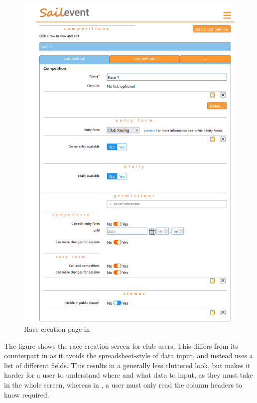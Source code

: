 \documentclass{l4proj}
\begin{document}
\begin{figure}[H]
    \centering
    \includegraphics[width=1\linewidth]{images/Sailevent.png} 

    \caption{Race creation page in \citet{SailEvent}
    }

    \label{fig:sailEvent}
\end{figure}


The figure shows the race creation screen for club users. This differs from its counterpart in \citet{sailwave} as it avoids the spreadsheet-style of data input, and instead uses a list of different fields. This results in a generally less cluttered look, but makes it harder for a user to understand where and what data to input, as they must take in the whole screen, whereas in \citet{sailwave}, a user must only read the column headers to know required.
\end{document}
